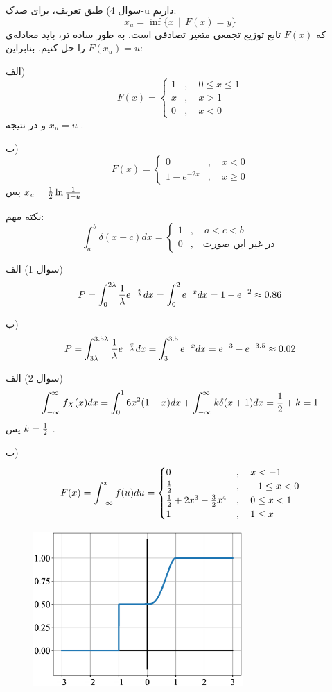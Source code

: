 \documentclass[10pt,letterpaper]{report}
\begin{document}
سوال 4) طبق تعریف، برای صدک-u داریم:
$$
x_u=\inf\{x\ \ |\ \ F(x)=y\}
$$
که $F(x)$ تابع توزیع تجمعی متغیر تصادفی است. به طور ساده تر، باید معادله‌ی 
$
F(x_u)=u
$
را حل کنیم. بنابراین:

الف)
$$
F(x)=\begin{cases}
1&,\quad 0\le x\le 1\\
x&,\quad x>1\\
0&,\quad x<0
\end{cases}
$$
و در نتیجه
$
x_u=u
$
.

ب)
$$
F(x)=\begin{cases}
0&,\quad x<0\\
1-e^{-2x}&,\quad x\ge 0
\end{cases}
$$
پس
$
x_u={1\over 2}\ln {1\over 1-u}
$

{\color{red}
نکته مهم:
$$
\int_a^b\delta(x-c)dx=\begin{cases}
1&,\quad a<c<b\\
0&,\quad \text{در غیر این صورت}
\end{cases}
$$
}

سوال 1) الف) 
$$
P=\int_0^{2\lambda}{1\over \lambda}e^{-{x\over\lambda}}dx
=\int_0^{2}e^{-x}dx=1-e^{-2}\approx0.86
$$

ب) 
$$
P=\int_{3\lambda}^{3.5\lambda}{1\over \lambda}e^{-{x\over\lambda}}dx
=\int_3^{3.5}e^{-x}dx=e^{-3}-e^{-3.5}\approx0.02
$$

سوال 2) الف)
$$
\int_{-\infty}^\infty f_X(x)dx=\int_0^16x^2(1-x)dx+\int_{-\infty}^{\infty}k\delta(x+1)dx={1\over2}+k=1
$$
پس
$
k={1\over 2}
$
.

ب)
$$
F(x)=\int_{-\infty}^xf(u)du=\begin{cases}
0&,\quad x<-1\\
{1\over 2}&,\quad -1\le x<0\\
{1\over 2}+2x^3-{3\over 2}x^4&,\quad 0\le x<1\\
1&,\quad 1\le x
\end{cases}
$$
\begin{figure}[htbp]
\centering
\includegraphics[width=80mm]{CDF_HW9.eps}
\end{figure}
\end{document}
